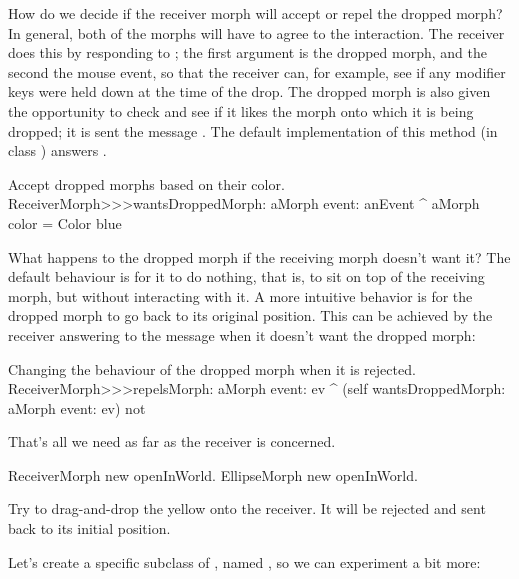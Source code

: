 \documentclass[a4paper,10pt,twoside]{book}
\begin{document}
How do we decide if the receiver morph will accept or repel the dropped morph?
In general, both of the morphs will have to agree to the interaction.
The receiver does this by responding to ; the first argument is the dropped morph, and the second the mouse event, so that the receiver can, for example, see if any modifier keys were held down at the time of the drop. 
The dropped morph is also given the opportunity to check and see if it likes the morph onto which it is being dropped; it is sent the message .  The default implementation of  this method (in class ) answers .

\begin{method}{Accept dropped morphs based on their color.}
ReceiverMorph>>>wantsDroppedMorph: aMorph event: anEvent
	^ aMorph color = Color blue
\end{method}

What happens to the dropped morph if the receiving morph doesn't want it?  The default behaviour is for it to do nothing, that is, to sit on top of the receiving morph, but without interacting with it.  A more intuitive behavior is for the dropped morph to go back to its original position.  This can be achieved by the receiver answering  to the message  when it doesn't want the dropped morph:

\begin{method}{Changing the behaviour of the dropped morph when it is rejected.}
ReceiverMorph>>>repelsMorph: aMorph event: ev
	^ (self wantsDroppedMorph: aMorph event: ev) not
\end{method}

That's all we need as far as the receiver is concerned.

\begin{code}{}
ReceiverMorph new openInWorld.
EllipseMorph new openInWorld.
\end{code}
\noindent
Try to drag-and-drop the yellow  onto the receiver. It will be rejected and sent back to its initial position.


Let's create a specific subclass of , named , so we can experiment a bit more:
\end{document}
